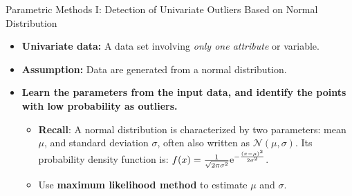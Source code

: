 \begin{frame}{Parametric Methods I: Detection of Univariate Outliers Based on Normal Distribution}
	\begin{itemize}
		\item \textbf{Univariate data:} A data set involving \textit{only one attribute} or variable.
		\item \textbf{Assumption:} Data are generated from a normal distribution.
		\item \textbf{Learn the parameters from the input data, and identify the points with low probability as outliers.}
		      \begin{itemize}
			      \item \textbf{\color{faugray}Recall}: A normal distribution is characterized by two parameters: mean $\mu$, and standard deviation $\sigma$, often also written as $\mathcal{N}(\mu, \sigma)$. Its probability density function is: $f(x)=\frac{1}{\sqrt{2\pi \sigma^2}} {\rm e}^{-\frac{(x-\mu)^2}{2\sigma^2}}$.
			      \item Use \textbf{maximum likelihood method} to estimate $\mu$ and $\sigma$.
		      \end{itemize}
	\end{itemize}
\end{frame}


